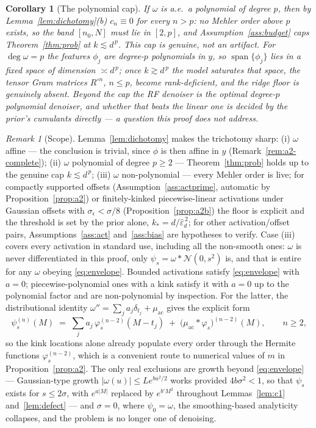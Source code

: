 \documentclass[11pt]{article}
\newtheorem{corollary}{Corollary}
\theoremstyle{remark}
\newtheorem{remark}{Remark}
\begin{document}
\begin{corollary}[The polynomial cap]\label{cor:polycap}
If $\omega$ is a.e.\ a polynomial of degree $p$, then by Lemma~\ref{lem:dichotomy}(b) $c_n \equiv 0$ for every $n > p$: no Mehler order above $p$ exists, so the band $[n_0,N]$ must lie in $[2,p]$, and Assumption~\ref{ass:budget} caps Theorem~\ref{thm:prob} at $k \lesssim d^{\,p}$. This cap is genuine, not an artifact. For $\deg\omega = p$ the features $\phi_j$ are degree-$p$ polynomials in $y$, so $\operatorname{span}\{\phi_j\}$ lies in a fixed space of dimension $\asymp d^{\,p}$; once $k \gtrsim d^{\,p}$ the model saturates that space, the tensor Gram matrices $R^{\circ n}$, $n \le p$, become rank-deficient, and the ridge floor is genuinely absent. Beyond the cap the RF denoiser \emph{is} the optimal degree-$p$ polynomial denoiser, and whether that beats the linear one is decided by the prior's cumulants directly --- a question this proof does not address.
\end{corollary}

\begin{remark}[Scope]\label{rem:scope-act}
Lemma~\ref{lem:dichotomy} makes the trichotomy sharp: (i) $\omega$ affine --- the conclusion is trivial, since $\phi$ is then affine in $y$ (Remark~\ref{rem:a2-complete}); (ii) $\omega$ polynomial of degree $p \ge 2$ --- Theorem~\ref{thm:prob} holds up to the genuine cap $k \lesssim d^{\,p}$; (iii) $\omega$ non-polynomial --- every Mehler order is live; for compactly supported offsets (Assumption~\ref{ass:actprime}, automatic by Proposition~\ref{prop:a2}) or finitely-kinked piecewise-linear activations under Gaussian offsets with $\sigma_\epsilon < \sigma/8$ (Proposition~\ref{prop:a2b}) the floor is explicit and the threshold is set by the prior alone, $k_* = d/\hat\varepsilon_d^{\,2}$; for other activation/offset pairs, Assumptions~\ref{ass:act} and~\ref{ass:bias} are hypotheses to verify. Case (iii) covers every activation in standard use, including all the non-smooth ones: $\omega$ is never differentiated in this proof, only $\psi_s = \omega * \mathcal N(0,s^2)$ is, and that is entire for any $\omega$ obeying \eqref{eq:envelope}. Bounded activations satisfy \eqref{eq:envelope} with $a = 0$; piecewise-polynomial ones with a kink satisfy it with $a = 0$ up to the polynomial factor and are non-polynomial by inspection. For the latter, the distributional identity $\omega'' = \sum_j a_j\delta_{t_j} + \mu_{\mathrm{ac}}$ gives the explicit form
\[
\psi_s^{(n)}(M) \;=\; \sum_j a_j\,\varphi_s^{(n-2)}(M - t_j) \;+\; \big(\mu_{\mathrm{ac}} * \varphi_s\big)^{(n-2)}(M), \qquad n \ge 2,
\]
so the kink locations alone already populate every order through the Hermite functions $\varphi_s^{(n-2)}$, which is a convenient route to numerical values of $m$ in Proposition~\ref{prop:a2}. The only real exclusions are growth beyond \eqref{eq:envelope} --- Gaussian-type growth $|\omega(u)| \le Le^{bu^2/2}$ works provided $4b\sigma^2 < 1$, so that $\psi_s$ exists for $s \le 2\sigma$, with $e^{a|M|}$ replaced by $e^{b'M^2}$ throughout Lemmas~\ref{lem:c1} and~\ref{lem:defect} --- and $\sigma = 0$, where $\psi_0 = \omega$, the smoothing-based analyticity collapses, and the problem is no longer one of denoising.
\end{remark}
\end{document}
